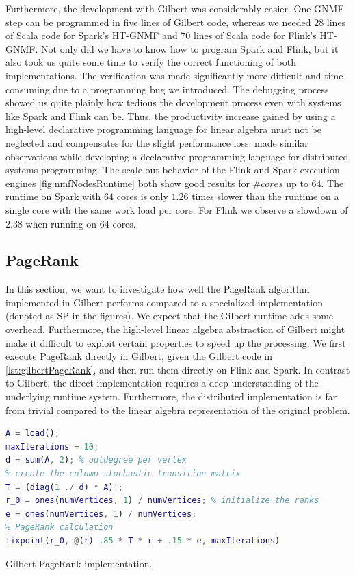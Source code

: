 Furthermore, the development with Gilbert was considerably easier.
One GNMF step can be programmed in five lines of Gilbert code, whereas we needed $28$ lines of Scala code for Spark's HT-GNMF and $70$ lines of Scala code for Flink's HT-GNMF.
Not only did we have to know how to program Spark and Flink, but it also took us quite some time to verify the correct functioning of both implementations.
The verification was made significantly more difficult and time-consuming due to a programming bug we introduced.
The debugging process showed us quite plainly how tedious the development process even with systems like Spark and Flink can be.
Thus, the productivity increase gained by using a high-level declarative programming language for linear algebra must not be neglected and compensates for the slight performance loss.
\cite{alvaro:2010a} made similar observations while developing a declarative programming language for distributed systems programming.
The scale-out behavior of the Flink and Spark execution engines \cref{fig:nmfNodesRuntime} both show good results for $\#cores$ up to $64$.
The runtime on Spark with $64$ cores is only $1.26$ times slower than the runtime on a single core with the same work load per core.
For Flink we observe a slowdown of $2.38$ when running on $64$ cores.

\subsection{PageRank}

In this section, we want to investigate how well the PageRank algorithm~\cite{page:1999a} implemented in Gilbert performs compared to a specialized implementation (denoted as SP in the figures).
We expect that the Gilbert runtime adds some overhead.
Furthermore, the high-level linear algebra abstraction of Gilbert might make it difficult to exploit certain properties to speed up the processing.
We first execute PageRank directly in Gilbert, given the Gilbert code in \cref{lst:gilbertPageRank}, and then run them directly on Flink and Spark.
In contrast to Gilbert, the direct implementation requires a deep understanding of the underlying runtime system.
Furthermore, the distributed implementation is far from trivial compared to the linear algebra representation of the original problem.
\begin{listing}[htbp]
	\begin{lstlisting}[language=Matlab,
		commentstyle=\color{black},
		  stringstyle=\color{black},
		  keywordstyle=\color{black}\bfseries,
		  morekeywords={ones, fixpoint},
		  xleftmargin=.0\textwidth,
		  basicstyle=\small]
% load adjacency matrix
A = load();
maxIterations = 10;
d = sum(A, 2); % outdegree per vertex
% create the column-stochastic transition matrix
T = (diag(1 ./ d) * A)'; 
r_0 = ones(numVertices, 1) / numVertices; % initialize the ranks
e = ones(numVertices, 1) / numVertices;
% PageRank calculation
fixpoint(r_0, @(r) .85 * T * r + .15 * e, maxIterations)
	\end{lstlisting}
	\caption{Gilbert PageRank implementation.}
	\label{lst:gilbertPageRank}
\end{listing}

